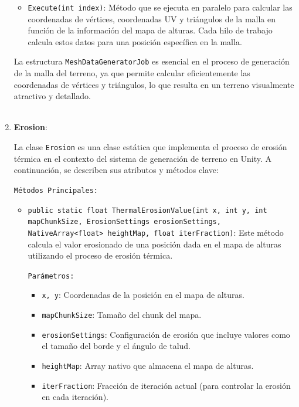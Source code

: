 \begin{enumerate}
\begin{itemize}
        \item \texttt{Execute(int index)}: Método que se ejecuta en paralelo para calcular las coordenadas de vértices, coordenadas UV y triángulos de la malla en función de la información del mapa de alturas. Cada hilo de trabajo calcula estos datos para una posición específica en la malla.

    \end{itemize}

    La estructura \texttt{MeshDataGeneratorJob} es esencial en el proceso de generación de la malla del terreno, ya que permite calcular eficientemente las coordenadas de vértices y triángulos, lo que resulta en un terreno visualmente atractivo y detallado.\\
    \\

    \item \textbf{Erosion}:

    La clase \texttt{Erosion} es una clase estática que implementa el proceso de erosión térmica en el contexto del sistema de generación de terreno en Unity. A continuación, se describen sus atributos y métodos clave:

    \texttt{Métodos Principales:}

    \begin{itemize}
        \item \texttt{public static float ThermalErosionValue(int x, int y, int mapChunkSize, ErosionSettings erosionSettings, NativeArray<float> heightMap, float iterFraction)}: Este método calcula el valor erosionado de una posición dada en el mapa de alturas utilizando el proceso de erosión térmica.

        \texttt{Parámetros:}

        \begin{itemize}
            \item \texttt{x, y}: Coordenadas de la posición en el mapa de alturas.
            \item \texttt{mapChunkSize}: Tamaño del chunk del mapa.
            \item \texttt{erosionSettings}: Configuración de erosión que incluye valores como el tamaño del borde y el ángulo de talud.
            \item \texttt{heightMap}: Array nativo que almacena el mapa de alturas.
            \item \texttt{iterFraction}: Fracción de iteración actual (para controlar la erosión en cada iteración).
        \end{itemize}


\end{itemize}
\end{enumerate}
